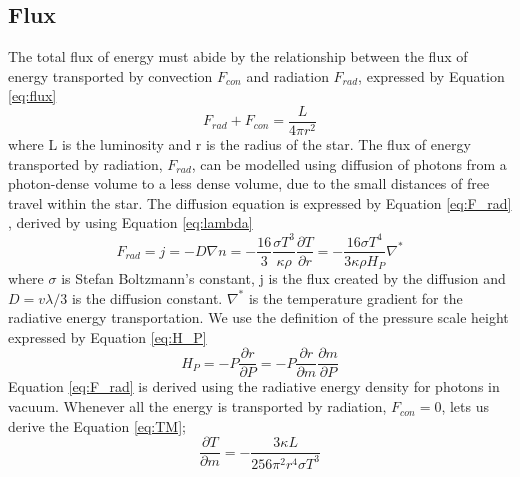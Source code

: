 \documentclass[10pt, nofootinbib, twocolumn]{revtex4-1}
\begin{document}
\subsection{Flux}
The total flux of energy must abide by the relationship between the flux of energy transported by convection $F_{con}$ and radiation $F_{rad}$, expressed by Equation \eqref{eq:flux}
\begin{equation}\label{eq:flux}
    F_{rad} +F_{con} = \frac{L}{4\pi r^2}
\end{equation}
where L is the luminosity and r is the radius of the star. The flux of energy transported by radiation, $F_{rad}$, can be modelled using diffusion of photons from a photon-dense volume to a less dense volume, due to the small distances of free travel within the star. The diffusion equation is expressed by Equation \eqref{eq:F_rad} \cite{ast}, derived by using Equation \eqref{eq:lambda} \\
\begin{equation}\label{eq:F_rad}
    F_{rad}=j=-D\nabla n = -\frac{16}{3}\frac{\sigma T^3}{\kappa \rho}\frac{\partial T}{\partial r} = -\frac{16\sigma T^4}{3\kappa \rho H_P}\nabla^*
\end{equation}
where $\sigma$ is Stefan Boltzmann's constant, j is the flux created by the diffusion and $D=v\lambda /3$ is the diffusion constant. $\nabla^*$ is the temperature gradient for the radiative energy transportation. 
We use the definition of the pressure scale height expressed by Equation \eqref{eq:H_P}
\begin{equation}\label{eq:H_P}
    H_P=-P\frac{\partial r}{\partial P} = -P\frac{\partial r}{\partial m}\frac{\partial m}{\partial P}
\end{equation}
Equation \eqref{eq:F_rad} is derived using the radiative energy density for photons in vacuum. Whenever all the energy is transported by radiation, $F_{con} = 0$, lets us derive the Equation \eqref{eq:TM}; 
\begin{equation}\label{eq:TM}
    \frac{\partial T}{\partial m} = -\frac{3\kappa L}{256 \pi^2r^4\sigma T^3} 
\end{equation}
\end{document}
